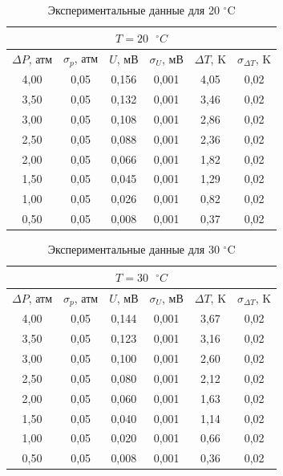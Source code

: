 \documentclass[a4paper,12pt]{article} %
\begin{document}
\begin{table}[H]
	\centering
	\begin{tabular}{|c|c|c|c|c|c|}
		\hline
		\multicolumn{6}{|c|}{$ T = 20 \text{ } ^\circ C $} \\ \hline
		$ \Delta P $, атм & $ \sigma_p $, атм & $ U $, мВ & $ \sigma_U $, мВ & $ \Delta T $, K & $ \sigma_{\Delta T} $, K \\ \hline
		4,00 & 0,05 & 0,156 & 0,001 & 4,05 & 0,02 \\ \hline
		3,50 & 0,05 & 0,132 & 0,001 & 3,46 & 0,02 \\ \hline
		3,00 & 0,05 & 0,108 & 0,001 & 2,86 & 0,02 \\ \hline
		2,50 & 0,05 & 0,088 & 0,001 & 2,36 & 0,02 \\ \hline
		2,00 & 0,05 & 0,066 & 0,001 & 1,82 & 0,02 \\ \hline
		1,50 & 0,05 & 0,045 & 0,001 & 1,29 & 0,02 \\ \hline
		1,00 & 0,05 & 0,026 & 0,001 & 0,82 & 0,02 \\ \hline
		0,50 & 0,05 & 0,008 & 0,001 & 0,37 & 0,02 \\ \hline
	\end{tabular}
	\caption{Экспериментальные данные для 20 $^\circ$C}
	\label{tab:20C}
\end{table}

\begin{table}[H]
	\centering
	\begin{tabular}{|c|c|c|c|c|c|}
		\hline
		\multicolumn{6}{|c|}{$ T = 30 \text{ } ^\circ C $} \\ \hline
		$ \Delta P $, атм & $ \sigma_p $, атм & $ U $, мВ & $ \sigma_U $, мВ & $ \Delta T $, K & $ \sigma_{\Delta T} $, K \\ \hline
		4,00 & 0,05 & 0,144 & 0,001 & 3,67 & 0,02 \\ \hline
		3,50 & 0,05 & 0,123 & 0,001 & 3,16 & 0,02 \\ \hline
		3,00 & 0,05 & 0,100 & 0,001 & 2,60 & 0,02 \\ \hline
		2,50 & 0,05 & 0,080 & 0,001 & 2,12 & 0,02 \\ \hline
		2,00 & 0,05 & 0,060 & 0,001 & 1,63 & 0,02 \\ \hline
		1,50 & 0,05 & 0,040 & 0,001 & 1,14 & 0,02 \\ \hline
		1,00 & 0,05 & 0,020 & 0,001 & 0,66 & 0,02 \\ \hline
		0,50 & 0,05 & 0,008 & 0,001 & 0,36 & 0,02 \\ \hline
	\end{tabular}
	\caption{Экспериментальные данные для 30 $^\circ$C}
	\label{tab:30C}
\end{table}
\end{document}
